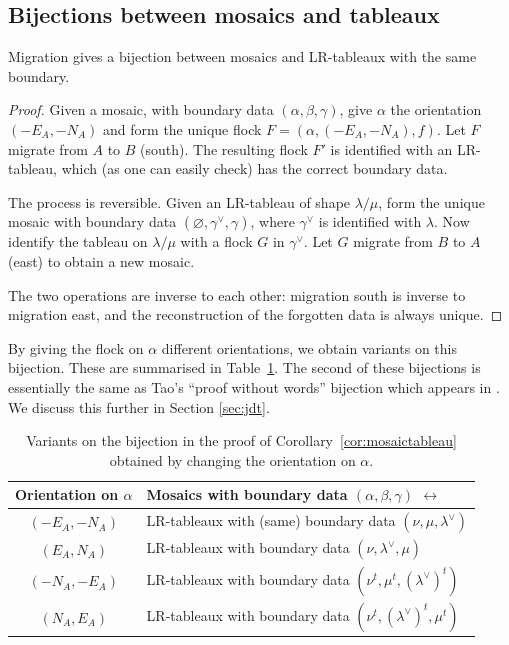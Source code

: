 \subsection{Bijections between mosaics and tableaux}
\begin{corollary}
\label{cor:mosaictableau}
Migration gives a bijection between mosaics and LR-tableaux with
the same boundary.
\end{corollary}

\begin{proof}
Given a mosaic, with boundary
data $(\alpha, \beta, \gamma)$, give $\alpha$ the orientation
$(-E_A, -N_A)$
and form the unique flock $F = (\alpha, (-E_A,-N_A), f)$.  Let $F$
migrate from $A$ to $B$ (south).
The resulting flock $F'$ is identified with an LR-tableau, which 
(as one can easily check) has the correct boundary data.

The process is reversible.  Given an LR-tableau of shape $\lambda/\mu$,
form the unique mosaic with boundary data 
$(\varnothing, \gamma^\vee, \gamma)$, where
$\gamma^\vee$ is identified with $\lambda$.
Now identify the tableau on $\lambda/\mu$ with a flock $G$
in $\gamma^\vee$.  Let $G$ migrate from $B$ to $A$ (east) to obtain 
a new mosaic.

The two operations are inverse to each other:  migration south is
inverse to migration east, and the reconstruction of the forgotten
data is always unique.
\end{proof}

By giving the flock on $\alpha$ different orientations, we obtain
variants on this bijection.  These are summarised in 
Table~\ref{tbl:variants}.
The second of these bijections is essentially the same as Tao's 
``proof without words'' bijection which appears in \cite{vakil}.  
We discuss this further in Section \ref{sec:jdt}.

%
\begin{table}[htbp]

\begin{center}
\begin{tabular}{|c|l|}
\hline
Orientation on $\alpha$ & 
Mosaics with boundary data $(\alpha,\beta,\gamma)$ $\leftrightarrow$
\\ \hline \hline
$(-E_A, -N_A)$ & 
LR-tableaux with (same) boundary data $(\nu, \mu, \lambda^\vee)$
\\ \hline
$(E_A, N_A)$ & 
LR-tableaux with boundary data $(\nu, \lambda^\vee, \mu)$
\\ \hline
$(-N_A, -E_A)$ & 
LR-tableaux with  boundary data $(\nu^t, \mu^t, (\lambda^\vee)^t)$
\\ \hline
$(N_A, E_A)$ & LR-tableaux with boundary data $(\nu^t, (\lambda^\vee)^t, \mu^t)$
\\ \hline
\end{tabular}
\end{center}
\caption{Variants on the bijection in the proof 
of Corollary~\ref{cor:mosaictableau}
obtained by changing the orientation on $\alpha$.}
\label{tbl:variants}
\end{table}
%

